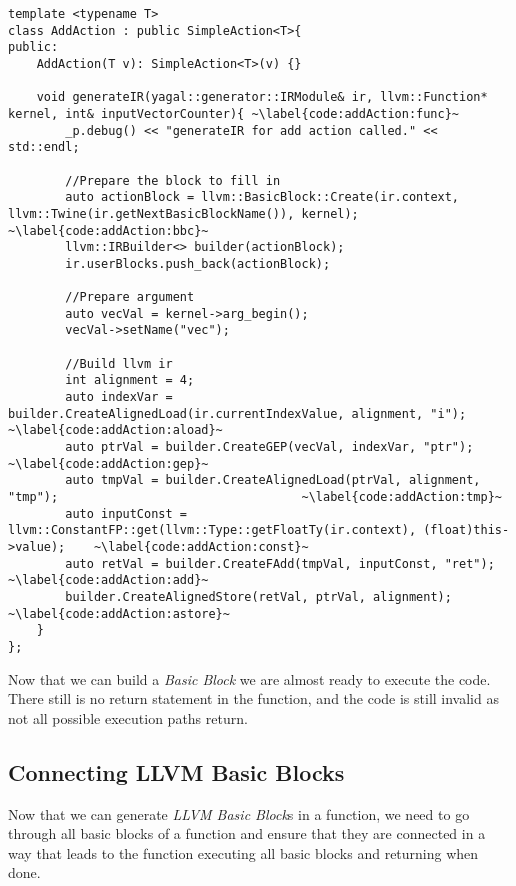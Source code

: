 \begin{lstlisting}[caption={The AddAction class.}, label={code:addAction}]
template <typename T>
class AddAction : public SimpleAction<T>{
public:
    AddAction(T v): SimpleAction<T>(v) {}

    void generateIR(yagal::generator::IRModule& ir, llvm::Function* kernel, int& inputVectorCounter){ ~\label{code:addAction:func}~
        _p.debug() << "generateIR for add action called." << std::endl;

        //Prepare the block to fill in
        auto actionBlock = llvm::BasicBlock::Create(ir.context, llvm::Twine(ir.getNextBasicBlockName()), kernel); ~\label{code:addAction:bbc}~
        llvm::IRBuilder<> builder(actionBlock);
        ir.userBlocks.push_back(actionBlock);

        //Prepare argument
        auto vecVal = kernel->arg_begin();
        vecVal->setName("vec");

        //Build llvm ir
        int alignment = 4;
        auto indexVar = builder.CreateAlignedLoad(ir.currentIndexValue, alignment, "i");                    ~\label{code:addAction:aload}~
        auto ptrVal = builder.CreateGEP(vecVal, indexVar, "ptr");                                           ~\label{code:addAction:gep}~
        auto tmpVal = builder.CreateAlignedLoad(ptrVal, alignment, "tmp");                                  ~\label{code:addAction:tmp}~
        auto inputConst = llvm::ConstantFP::get(llvm::Type::getFloatTy(ir.context), (float)this->value);    ~\label{code:addAction:const}~
        auto retVal = builder.CreateFAdd(tmpVal, inputConst, "ret");                                        ~\label{code:addAction:add}~
        builder.CreateAlignedStore(retVal, ptrVal, alignment);                                              ~\label{code:addAction:astore}~
    }
};
\end{lstlisting}

Now that we can build a \textit{Basic Block} we are almost ready to execute the code. There still is no return statement in the function, and the code is still invalid as not all possible execution paths return.

\subsection{Connecting LLVM Basic Blocks} \label{sec:bblinking}
Now that we can generate \textit{LLVM Basic Block}s in a function, we need to go through all basic blocks of a function and ensure that they are connected in a way that leads to the function executing all basic blocks and returning when done.

